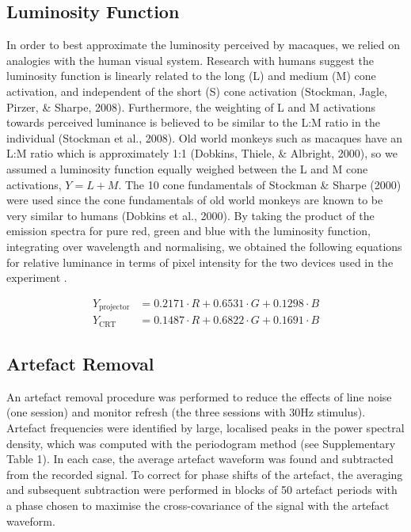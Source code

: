 \subsection{Luminosity Function}
In order to best approximate the luminosity perceived by macaques, we relied on analogies with the human visual system. Research with humans suggest the luminosity function is linearly related to the long (L) and medium (M) cone activation, and independent of the short (S) cone activation (Stockman, Jagle, Pirzer, \& Sharpe, 2008). Furthermore, the weighting of L and M activations towards perceived luminance is believed to be similar to the L:M ratio in the individual (Stockman et al., 2008). Old world monkeys such as macaques have an L:M ratio which is approximately 1:1 (Dobkins, Thiele, \& Albright, 2000), so we assumed a luminosity function equally weighed between the L and M cone activations,  $Y=L+M$. The 10{\textdegree} cone fundamentals of Stockman \& Sharpe (2000) were used since the cone fundamentals of old world monkeys are known to be very similar to humans (Dobkins et al., 2000). By taking the product of the emission spectra for pure red, green and blue with the luminosity function, integrating over wavelength and normalising, we obtained the following equations for relative luminance in terms of pixel intensity for the two devices used in the experiment .

\begin{align*}
    Y_{\text{projector}} &= 0.2171 \cdot R + 0.6531 \cdot G + 0.1298 \cdot B\\
    Y_{\text{CRT}}       &= 0.1487 \cdot R + 0.6822 \cdot G + 0.1691 \cdot B
\end{align*}

\subsection{Artefact Removal}
An artefact removal procedure was performed to reduce the effects of line noise (one session) and monitor refresh (the three sessions with 30Hz stimulus). Artefact frequencies were identified by large, localised peaks in the power spectral density, which was computed with the periodogram method (see Supplementary Table 1). In each case, the average artefact waveform was found and subtracted from the recorded signal. To correct for phase shifts of the artefact, the averaging and subsequent subtraction were performed in blocks of 50 artefact periods with a phase chosen to maximise the cross-covariance of the signal with the artefact waveform.

